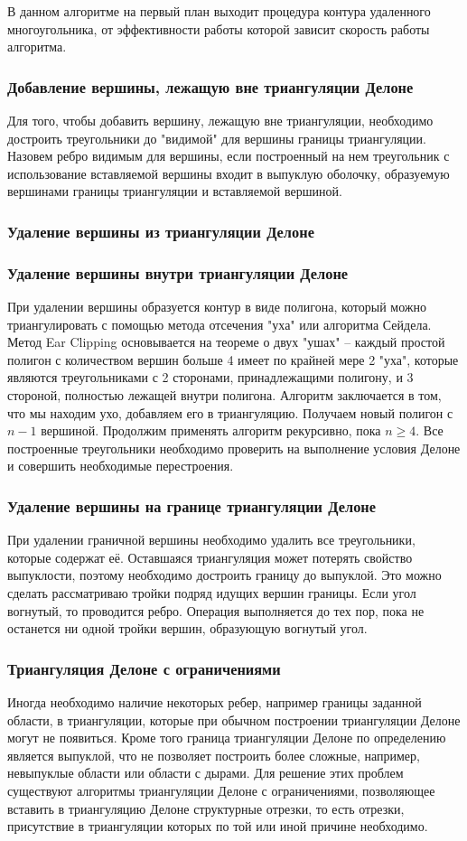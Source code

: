 \documentclass{fefu}
\begin{document}
В данном алгоритме на первый план выходит процедура контура удаленного многоугольника, от эффективности работы которой
зависит скорость работы алгоритма.
\subsubsection{Добавление вершины, лежащую вне триангуляции Делоне}
\label{AddOutsideOfTriangulationVertex}
Для того, чтобы добавить вершину, лежащую вне триангуляции, необходимо достроить треугольники до "видимой" для вершины
границы триангуляции. Назовем ребро видимым для вершины, если построенный на нем треугольник с использование вставляемой
вершины  входит в выпуклую оболочку, образуемую вершинами границы триангуляции и вставляемой вершиной.
\subsubsection{Удаление вершины из триангуляции Делоне}
\subsubsection{Удаление вершины внутри триангуляции Делоне}
При удалении вершины образуется контур в виде полигона, который можно триангулировать с помощью метода отсечения
"уха" \cite{EarClipping} или алгоритма Сейдела\cite{Seidel}. Метод Ear Clipping основывается на теореме о двух "ушах" --
каждый простой полигон с количеством вершин больше 4 имеет по крайней мере 2 "уха", которые являются треугольниками с 2
сторонами, принадлежащими полигону, и 3 стороной, полностью лежащей внутри полигона. Алгоритм заключается в том, что
мы находим ухо, добавляем его в триангуляцию. Получаем новый полигон с $n - 1$ вершиной. Продолжим применять алгоритм
рекурсивно, пока $n \geq 4$. Все построенные треугольники необходимо проверить на выполнение условия Делоне и совершить
необходимые перестроения.
\subsubsection{Удаление вершины на границе триангуляции Делоне}
При удалении граничной вершины необходимо удалить все треугольники, которые содержат её. Оставшаяся триангуляция может
потерять свойство выпуклости, поэтому необходимо достроить границу до выпуклой. Это можно сделать рассматриваю тройки
подряд идущих вершин границы. Если угол вогнутый, то проводится ребро. Операция выполняется до тех пор, пока не останется
ни одной тройки вершин, образующую вогнутый угол.
\subsubsection{Триангуляция Делоне с ограничениями}
Иногда необходимо наличие некоторых ребер, например границы заданной области, в триангуляции, которые при обычном построении триангуляции Делоне могут
не появиться. Кроме того граница триангуляции Делоне по определению является выпуклой, что не позволяет построить более
сложные, например, невыпуклые области или области с дырами. Для решение этих проблем существуют алгоритмы триангуляции
Делоне с ограничениями, позволяющее вставить в триангуляцию Делоне структурные отрезки, то есть отрезки, присутствие в
триангуляции которых по той или иной причине необходимо.
\end{document}
